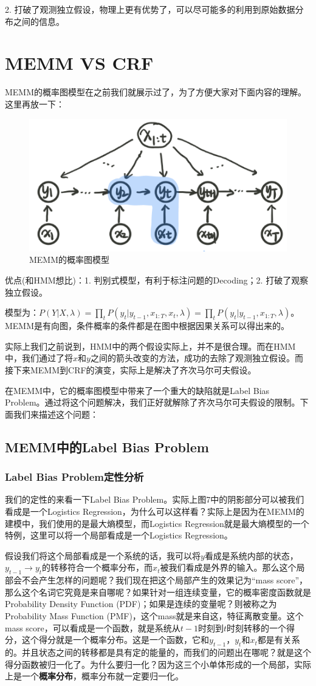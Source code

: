 \documentclass[a4paper]{article}
\begin{document}
2. 打破了观测独立假设，物理上更有优势了，可以尽可能多的利用到原始数据分布之间的信息。

\section{MEMM VS CRF}
MEMM的概率图模型在之前我们就展示过了，为了方便大家对下面内容的理解。这里再放一下：
\begin{figure}[H]
    \centering
    \includegraphics[width=.5\textwidth]{微信图片_20200221213227.png}
    \caption{MEMM的概率图模型}
    \label{fig:my_label_1}
\end{figure}
优点(和HMM想比)：1. 判别式模型，有利于标注问题的Decoding；2. 打破了观察独立假设。

模型为：$P(Y|X,\lambda)=\prod_t P(y_t|y_{t-1},x_{1:T},x_t,\lambda)=\prod_t P(y_t|y_{t-1},x_{1:T},\lambda)$。MEMM是有向图，条件概率的条件都是在图中根据因果关系可以得出来的。

实际上我们之前说到，HMM中的两个假设实际上，并不是很合理。而在HMM中，我们通过了将$x$和$y$之间的箭头改变的方法，成功的去除了观测独立假设。而接下来MEMM到CRF的演变，实际上是解决了齐次马尔可夫假设。

在MEMM中，它的概率图模型中带来了一个重大的缺陷就是Label Bias Problem。通过将这个问题解决，我们正好就解除了齐次马尔可夫假设的限制。下面我们来描述这个问题：

\subsection{MEMM中的Label Bias Problem}
\subsubsection{Label Bias Problem定性分析}
我们的定性的来看一下Label Bias Problem。实际上图7中的阴影部分可以被我们看成是一个Logistics Regression，为什么可以这样看？实际上是因为在MEMM的建模中，我们使用的是最大熵模型，而Logistics Regression就是最大熵模型的一个特例，这里可以将一个局部看成是一个Logistics Regression。

假设我们将这个局部看成是一个系统的话，我可以将$y$看成是系统内部的状态，$y_{t-1}\rightarrow y_{t}$的转移符合一个概率分布，而$x_t$被我们看成是外界的输入。那么这个局部会不会产生怎样的问题呢？我们现在把这个局部产生的效果记为“mass score”，那么这个名词它究竟是来自哪呢？如果针对一组连续变量，它的概率密度函数就是Probability Density Function (PDF)；如果是连续的变量呢？则被称之为Probability Mass Function (PMF)，这个mass就是来自这，特征离散变量。这个mass score，可以看成是一个函数，就是系统从$t-1$时刻到$t$时刻转移的一个得分，这个得分就是一个概率分布。这是一个函数，它和$y_{t-1}$，$y_t$和$x_t$都是有关系的。并且状态之间的转移都是具有定的能量的，而我们的问题出在哪呢？就是这个得分函数被归一化了。为什么要归一化？因为这三个小单体形成的一个局部，实际上是一个\textbf{概率分布}，概率分布就一定要归一化。
\end{document}
